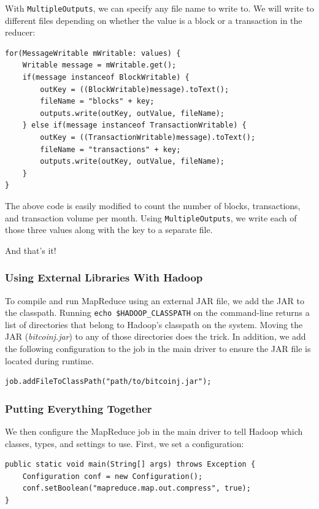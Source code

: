 \documentclass[9pt,twocolumn,twoside]{idsi}
\begin{document}
With \lstinline{MultipleOutputs}, we can specify any file name to write to. We will write to different files depending on whether the value is a block or a transaction in the reducer:

\begin{lstlisting}
for(MessageWritable mWritable: values) {
    Writable message = mWritable.get();
    if(message instanceof BlockWritable) {
        outKey = ((BlockWritable)message).toText();
        fileName = "blocks" + key;
        outputs.write(outKey, outValue, fileName);
    } else if(message instanceof TransactionWritable) {
        outKey = ((TransactionWritable)message).toText();
        fileName = "transactions" + key;
        outputs.write(outKey, outValue, fileName);
    }
}
\end{lstlisting}

The above code is easily modified to count the number of blocks, transactions, and transaction volume per month. Using \lstinline{MultipleOutputs}, we write each of those three values along with the key to a separate file.

And that's it!
\subsubsection{Using External Libraries With Hadoop}
To compile and run MapReduce using an external JAR file, we add the JAR to the classpath. Running \lstinline{echo $HADOOP_CLASSPATH} on the command-line returns a list of directories that belong to Hadoop's classpath on the system. Moving the JAR (\emph{bitcoinj.jar}) to any of those directories does the trick. In addition, we add the following configuration to the job in the main driver to ensure the JAR file is located during runtime.

\begin{lstlisting}
job.addFileToClassPath("path/to/bitcoinj.jar");
\end{lstlisting}

\subsubsection{Putting Everything Together}
We then configure the MapReduce job in the main driver to tell Hadoop which classes, types, and settings to use. First, we set a configuration:

\begin{lstlisting}
public static void main(String[] args) throws Exception {
    Configuration conf = new Configuration();
    conf.setBoolean("mapreduce.map.out.compress", true);
}
\end{lstlisting}
\end{document}
